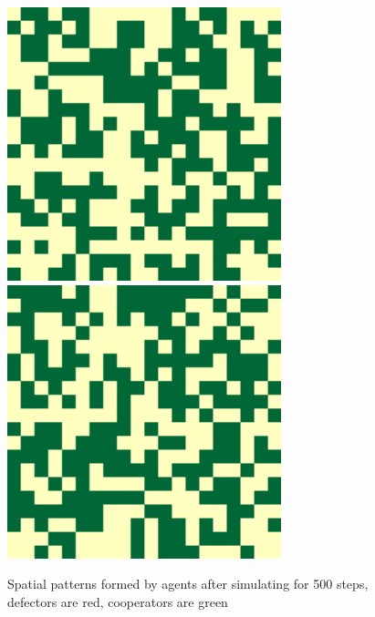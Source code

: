 \documentclass[runningheads]{llncs}
\begin{document}
\begin{figure}[!hb]
{    \includegraphics[width=\textwidth/4]{spatial-memory1+gossip1+range3-B.pdf}
    \includegraphics[width=\textwidth/4]{spatial-memory1+gossip1+range3-C.pdf}
  }
  \caption{Spatial patterns formed by agents after simulating for 500 steps, defectors are red, cooperators are green}
  \label{fig:spatial}
\end{figure}
\end{document}
